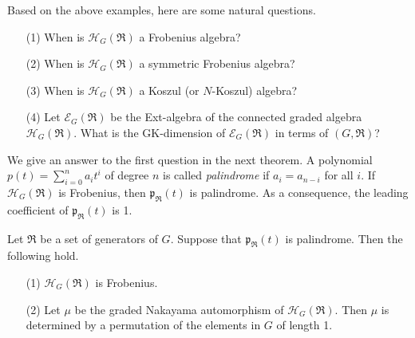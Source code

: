Based on the above examples, here are some natural questions.

\begin{question}
\label{xxque2.8}
\begin{enumerate}
\item[(1)]
When is ${\mathcal H}_G(\Re)$ a Frobenius algebra?
\item[(2)]
When is ${\mathcal H}_G(\Re)$ a symmetric Frobenius algebra?
\item[(3)]
When is ${\mathcal H}_G(\Re)$ a Koszul (or $N$-Koszul) algebra?
\item[(4)]
Let ${\mathcal E}_{G}(\Re)$ be the Ext-algebra of the connected graded 
algebra ${\mathcal H}_G(\Re)$.
What is the GK-dimension of ${\mathcal E}_{G}(\Re)$ in terms of $(G,\Re)$? 
\end{enumerate}
\end{question}

We give an answer to the first question in the next theorem. 
A polynomial $p(t)=\sum_{i=0}^n a_i t^i$ 
of degree $n$ 
is called {\it palindrome} if $a_i=a_{n-i}$ for all $i$. If ${\mathcal H}_G(\Re)$ 
is Frobenius, then ${\mathfrak{p}}_\Re(t)$ is palindrome. As a consequence, the leading 
coefficient of ${\mathfrak{p}}_\Re(t)$ is 1.

\begin{theorem}
\label{xxthm2.9}
Let $\Re$ be a set of generators of $G$. Suppose that 
${\mathfrak{p}}_\Re(t)$ is palindrome. Then the following hold.
\begin{enumerate}
\item[(1)]
${\mathcal H}_G(\Re)$ is Frobenius.
\item[(2)]
Let $\mu$ be the graded Nakayama automorphism of ${\mathcal H}_G(\Re)$.
Then $\mu$ is determined by a permutation of the elements in $G$ of length 1.
\end{enumerate}
\end{theorem}

